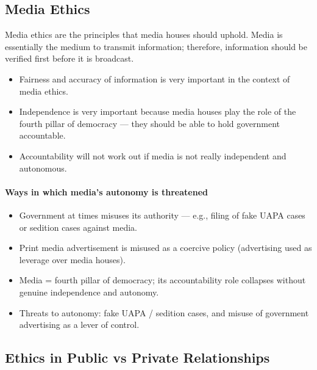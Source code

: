 \subsection{Media Ethics}

Media ethics are the principles that media houses should uphold. Media is essentially the medium to transmit information; therefore, information should be verified first before it is broadcast.

\begin{itemize}
\item Fairness and accuracy of information is very important in the context of media ethics.
\item Independence is very important because media houses play the role of the fourth pillar of democracy --- they should be able to hold government accountable.
\item Accountability will not work out if media is not really independent and autonomous.
\end{itemize}

\paragraph{Ways in which media's autonomy is threatened}
\begin{itemize}
\item Government at times misuses its authority --- e.g., filing of fake UAPA cases or sedition cases against media.
\item Print media advertisement is misused as a coercive policy (advertising used as leverage over media houses).
\end{itemize}

\begin{CriticalPoint}
\begin{itemize}
\item Media = fourth pillar of democracy; its accountability role collapses without genuine independence and autonomy.
\item Threats to autonomy: fake UAPA / sedition cases, and misuse of government advertising as a lever of control.
\end{itemize}
\end{CriticalPoint}

\subsection{Ethics in Public vs Private Relationships}

